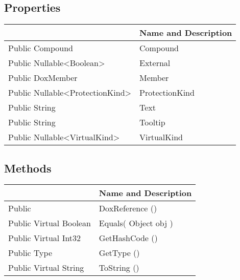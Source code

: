 \documentclass[11pt, oneside, a4paper]{book}
\begin{document}
\subsection{Properties}
\begin{center}
\begin{tabular}{| p{3cm} | p{12cm} | }
\hline
\textbf{ } & \textbf{ Name and Description}\\
\hline
 Public  Compound &  Compound\hypertarget{SoftwareEngineeringTools.{}Documentation.{}DoxReference.{}Compound}{}\\
\hline
 Public  Nullable<Boolean> &  External\hypertarget{SoftwareEngineeringTools.{}Documentation.{}DoxReference.{}External}{}\\
\hline
 Public  DoxMember &  Member\hypertarget{SoftwareEngineeringTools.{}Documentation.{}DoxReference.{}Member}{}\\
\hline
 Public  Nullable<ProtectionKind> &  ProtectionKind\hypertarget{SoftwareEngineeringTools.{}Documentation.{}DoxReference.{}ProtectionKind}{}\\
\hline
 Public  String &  Text\hypertarget{SoftwareEngineeringTools.{}Documentation.{}DoxReference.{}Text}{}\\
\hline
 Public  String &  Tooltip\hypertarget{SoftwareEngineeringTools.{}Documentation.{}DoxReference.{}Tooltip}{}\\
\hline
 Public  Nullable<VirtualKind> &  VirtualKind\hypertarget{SoftwareEngineeringTools.{}Documentation.{}DoxReference.{}VirtualKind}{}\\
\hline
\end{tabular}
\end{center}

\subsection{Methods}
\begin{center}
\begin{tabular}{| p{3cm} | p{12cm} | }
\hline
\textbf{ } & \textbf{ Name and Description}\\
\hline
 Public  &  DoxReference ()\hypertarget{SoftwareEngineeringTools.{}Documentation.{}DoxReference.{}DoxReference}{}\\
\hline
 Public  Virtual  Boolean &  Equals(\hypertarget{SoftwareEngineeringTools.{}Documentation.{}DoxReference.{}Equals\_Object}{} Object  obj  )\\
\hline
 Public  Virtual  Int32 &  GetHashCode ()\hypertarget{SoftwareEngineeringTools.{}Documentation.{}DoxReference.{}GetHashCode}{}\\
\hline
 Public  Type &  GetType ()\hypertarget{SoftwareEngineeringTools.{}Documentation.{}DoxReference.{}GetType}{}\\
\hline
 Public  Virtual  String &  ToString ()\hypertarget{SoftwareEngineeringTools.{}Documentation.{}DoxReference.{}ToString}{}\\
\hline
\end{tabular}
\end{center}
 
\end{document}
